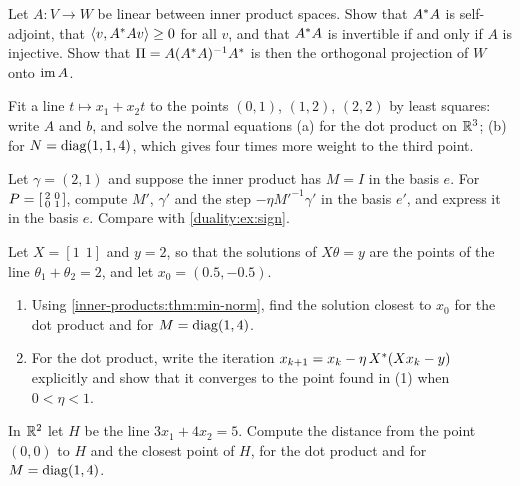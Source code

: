 \begin{notechapter}
\begin{exercise}\label{inner-products:exr:5}
Let $A:V\to W$ be linear between inner product spaces. Show that
$A^{*}A$ is self-adjoint, that $\left\langle v, A^{*}Av \right\rangle\geq0$ for all $v$, and
that $A^{*}A$ is invertible if and only if $A$ is injective. Show that
$\Pi = A(A^{*}A)^{-1}A^{*}$ is then the orthogonal projection of $W$ onto
$\operatorname{im} A$.
\end{exercise}

\begin{exercise}\label{inner-products:exr:6}
Fit a line $t\mapsto x_1 + x_2t$ to the points $(0, 1)$, $(1, 2)$,
$(2, 2)$ by least squares: write $A$ and $b$, and solve the normal
equations (a) for the dot product on $\mathbb{R}^3$; (b) for
$N = \operatorname{diag}(1, 1, 4)$, which gives four times more weight to the third
point.
\end{exercise}

\begin{exercise}\label{inner-products:exr:7}
Let $\gamma = (2, 1)$ and suppose the inner product has $M = I$ in the
basis $e$. For $P = \begin{bsmallmatrix}2 & 0\\0 & 1\end{bsmallmatrix}$,
compute $M'$, $\gamma'$ and the step $-\eta M'^{-1}\gamma'$ in the basis
$e'$, and express it in the basis $e$. Compare with
\cref{duality:ex:sign}.
\end{exercise}

\begin{exercise}\label{inner-products:exr:8}
Let $X = [1\ \ 1]$ and $y = 2$, so that the solutions of $X\theta = y$ are
the points of the line $\theta_1 + \theta_2 = 2$, and let
$x_0 = (0.5, -0.5)$.
\begin{enumerate}[nosep]
  \item Using \cref{inner-products:thm:min-norm}, find the solution
        closest to $x_0$ for the dot product and for $M = \operatorname{diag}(1, 4)$.
  \item For the dot product, write the iteration
        $x_{k+1} = x_k - \eta\,X^{*}(Xx_k - y)$ explicitly and show that
        it converges to the point found in (1) when $0 < \eta < 1$.
\end{enumerate}
\end{exercise}

\begin{exercise}\label{inner-products:exr:9}
In $\mathbb{R}^2$ let $H$ be the line $3x_1 + 4x_2 = 5$. Compute the distance from
the point $(0, 0)$ to $H$ and the closest point of $H$, for the dot
product and for $M = \operatorname{diag}(1, 4)$.
\end{exercise}
\end{notechapter}
